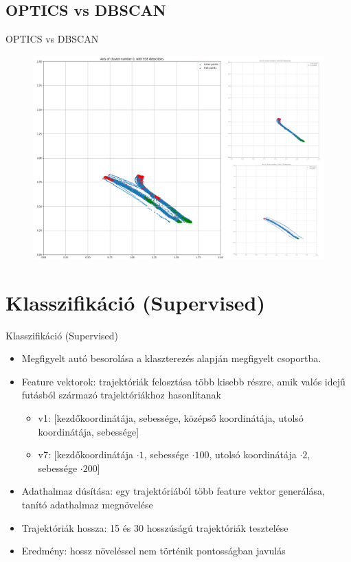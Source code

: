 \documentclass{beamer}
\begin{document}
\subsection{OPTICS vs DBSCAN}
\begin{frame}{OPTICS vs DBSCAN}
    \centering
    \begin{figure}
        \includegraphics[scale=0.2]{../bad_clustering/example_dbscan_vs_optics_merged_cluster.png}
    \end{figure}
\end{frame}

\section{Klasszifikáció (Supervised)}
\begin{frame}{Klasszifikáció (Supervised)}
    \begin{itemize}
        \item Megfigyelt autó besorolása a klaszterezés alapján megfigyelt csoportba.
        \item Feature vektorok: trajektóriák felosztása több kisebb részre, amik valós idejű futásból származó trajektóriákhoz hasonlítanak
        \begin{itemize}
            \item v1: [kezdőkoordinátája, sebessége, középső koordinátája, utolsó koordinátája, sebessége]
            \item v7: [kezdőkoordinátája $\cdot 1$, sebessége $\cdot 100$, utolsó koordinátája $\cdot 2$, sebessége $\cdot 200$]
        \end{itemize}
        \item Adathalmaz dúsítása: egy trajektóriából több feature vektor generálása, tanító adathalmaz megnövelése
        \item Trajektóriák hossza: 15 és 30 hosszúságú trajektóriák tesztelése
        \item Eredmény: hossz növeléssel nem történik pontosságban javulás
    \end{itemize}
\end{frame}
\end{document}
